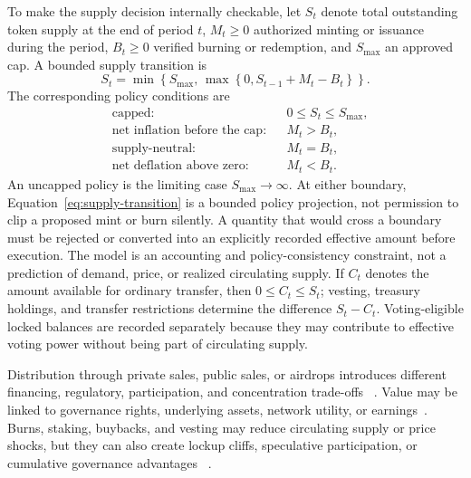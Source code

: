 \documentclass[referee,sn-basic]{sn-jnl}
\begin{document}
To make the supply decision internally checkable, let $S_t$ denote total
outstanding token supply at the end of period $t$, $M_t\geq0$ authorized
minting or issuance during the period, $B_t\geq0$ verified burning or
redemption, and $S_{\max}$ an approved cap. A bounded supply transition is
\begin{equation}\label{eq:supply-transition}
S_t=\min\!\left\{S_{\max},\,
       \max\!\left\{0,S_{t-1}+M_t-B_t\right\}\right\}.
\end{equation}
The corresponding policy conditions are
\begin{equation}\label{eq:supply-conditions}
\begin{aligned}
&\text{capped:} &&0\leq S_t\leq S_{\max},\\
&\text{net inflation before the cap:} &&M_t>B_t,\\
&\text{supply-neutral:} &&M_t=B_t,\\
&\text{net deflation above zero:} &&M_t<B_t.
\end{aligned}
\end{equation}
An uncapped policy is the limiting case $S_{\max}\rightarrow\infty$. At either
boundary, Equation~\eqref{eq:supply-transition} is a bounded policy projection,
not permission to clip a proposed mint or burn silently. A quantity that would
cross a boundary must be rejected or converted into an explicitly recorded
effective amount before execution. The model is an accounting and
policy-consistency constraint, not a prediction of demand, price, or realized
circulating supply. If $C_t$ denotes the amount available for ordinary transfer,
then $0\leq C_t\leq S_t$; vesting, treasury holdings, and transfer restrictions
determine the difference $S_t-C_t$. Voting-eligible locked balances are recorded
separately because they may contribute to effective voting power without being
part of circulating supply.

Distribution through private sales, public sales, or airdrops introduces
different financing, regulatory, participation, and concentration trade-offs
~\cite{Howell2020,Gan2022,Lommers2023}. Value may be linked to governance
rights, underlying assets, network utility, or earnings~\cite{Carvalho2022,
Freni2022,Lommers2022}. Burns, staking, buybacks, and vesting may reduce
circulating supply or price shocks, but they can also create lockup cliffs,
speculative participation, or cumulative governance advantages
~\cite{Allen2022,Yoo2021}.
\end{document}
